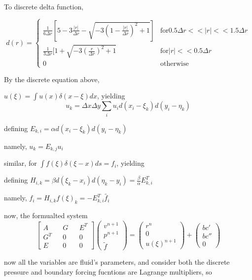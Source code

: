 \documentclass[11pt]{article}
\begin{document}
To discrete delta function, 

\begin{equation}
d(r) = \begin{cases} \frac{1}{6\Delta r} [ 5 - 3\frac{|r|}{\Delta r} - \sqrt{-3(1 - \frac{|r|}{\Delta r})^2 + 1 }]  & \mbox{for}  0.5\Delta r << |r| << 1.5\Delta r

\\	\frac{1}{3\Delta r}[1 + \sqrt{-3 (\frac{r}{\Delta r})^2 + 1} & \mbox{for} |r| << 0.5\Delta r

\\	0	&\mbox{otherwise}
\end{cases}
\end{equation}

By the discrete equation above, 

	$ u(\xi) = \int u(x) \delta(x - \xi) dx $, yielding
$$ u_k = \Delta x \Delta y \sum_i u_i d(x_i - \xi _k ) d(y_i - \eta _k)$$

defining  $  E_{k,i} = \alpha d(x_i - \xi _k ) d(y_i - \eta _k)$

namely,   $ u_k = E_{k,j} u_i $

similar, for $ \int f(\xi) \delta(\xi - x)ds = f_i $, yielding

defining $ H_{i,k} = \beta d(\xi _k - x_i) d(\eta_k - y_i) = \frac{\beta}{\alpha} E_{k,i}^T $

namely, $ f_i = H_{i,k} f(\xi)_k = -E_{k,i}^T \tilde{f_i} $


now, the formualted system 
$$ 
\begin{bmatrix} A && G && E^T \\ G^T && 0 && 0  \\ E && 0 && 0 \end{bmatrix} \begin{pmatrix} v^{n+1} \\ p^{n+1} \\ \tilde{f} \end{pmatrix} = \left( \begin{array}{c} r^n \\ 0 \\u(\xi)^{n+1}  \end{array} \right) + \left ( \begin{array}{c} bc' \\ bc'' \\ 0 \end{array} \right) $$

now all the variables are fluid's parameters, and consider both the discrete pressure and boundary forcing fucntions are Lagrange multipliers, so
\end{document}
